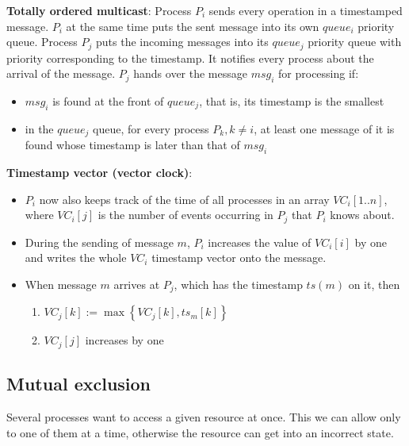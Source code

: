 \documentclass[margin=0px]{article}
\begin{document}
\noindent \textbf{Totally ordered multicast}: Process $P_{i}$ sends every operation in a timestamped
message. $P_{i}$ at the same time puts the sent message into its own $queue_{i}$ priority queue. Process $P_{j}$
puts the incoming messages into its $queue_{j}$ priority queue with priority corresponding to the timestamp.
It notifies every process about the arrival of the message.
$P_{j}$ hands over the message $msg_{i}$ for processing if:
\begin{itemize}
    \item	$msg_{i}$ is found at the front of $queue_{j}$, that is, its timestamp is the smallest
    \item	in the $queue_{j}$ queue, for every process $P_{k}, k \not = i$, at least one message of it is found whose
          timestamp is later than that of $msg_{i}$

\end{itemize}

\noindent \textbf{Timestamp vector (vector clock)}:
\begin{itemize}
    \item	$P_{i}$ now also keeps track of the time of all processes in an array $VC_{i}[1..n]$, where
          $VC_{i}[j]$ is the number of events occurring in $P_{j}$ that $P_{i}$ knows about.

    \item	During the sending of message $m$, $P_{i}$ increases the value of $VC_{i}[i]$ by one and writes the whole $VC_{i}$
          timestamp vector onto the message.

    \item	When message $m$ arrives at $P_{j}$, which has the timestamp $ts(m)$ on it, then
          \begin{enumerate}
              \item	$VC_{j}[k] := \max \left\{VC_{j}[k], ts_{m}[k]\right\}$
              \item	$VC_{j}[j]$ increases by one
          \end{enumerate}
\end{itemize}

\subsection{Mutual exclusion}

Several processes want to access a given resource at once. This we can allow only to one of them at a time,
otherwise the resource can get into an incorrect state.
\end{document}
